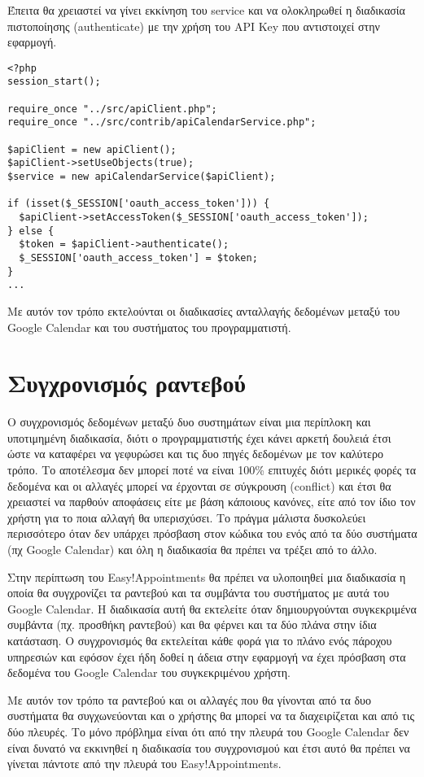 Έπειτα θα χρειαστεί να γίνει εκκίνηση του service και να ολοκληρωθεί η διαδικασία πιστοποίησης (authenticate) με την χρήση του API Key  που αντιστοιχεί στην εφαρμογή.

\begin{verbatim}
<?php
session_start();

require_once "../src/apiClient.php";
require_once "../src/contrib/apiCalendarService.php";

$apiClient = new apiClient();
$apiClient->setUseObjects(true);
$service = new apiCalendarService($apiClient);

if (isset($_SESSION['oauth_access_token'])) {
  $apiClient->setAccessToken($_SESSION['oauth_access_token']);
} else {
  $token = $apiClient->authenticate();
  $_SESSION['oauth_access_token'] = $token;
}
...
\end{verbatim}

Με αυτόν τον τρόπο εκτελούνται οι διαδικασίες ανταλλαγής δεδομένων μεταξύ του Google Calendar και του συστήματος του προγραμματιστή.

\section{Συγχρονισμός ραντεβού}
Ο συγχρονισμός δεδομένων μεταξύ δυο συστημάτων είναι μια περίπλοκη και υποτιμημένη διαδικασία, διότι ο προγραμματιστής έχει κάνει αρκετή δουλειά έτσι ώστε να καταφέρει να γεφυρώσει και τις δυο πηγές δεδομένων με τον καλύτερο τρόπο. Το αποτέλεσμα δεν μπορεί ποτέ να είναι 100\% επιτυχές διότι μερικές φορές τα δεδομένα και οι αλλαγές μπορεί να έρχονται σε σύγκρουση (conflict) και έτσι θα χρειαστεί να παρθούν αποφάσεις είτε με βάση κάποιους κανόνες, είτε από τον ίδιο τον χρήστη για το ποια αλλαγή θα υπερισχύσει. Το πράγμα μάλιστα δυσκολεύει περισσότερο όταν δεν υπάρχει πρόσβαση στον κώδικα του ενός από τα δύο συστήματα (πχ Google Calendar) και όλη η διαδικασία θα πρέπει να τρέξει από το άλλο. 

Στην περίπτωση του Easy!Appointments θα πρέπει να υλοποιηθεί μια διαδικασία η οποία θα συγχρονίζει τα ραντεβού και τα συμβάντα του συστήματος με αυτά του Google Calendar. Η διαδικασία αυτή θα εκτελείτε όταν δημιουργούνται συγκεκριμένα συμβάντα (πχ. προσθήκη ραντεβού) και θα φέρνει και τα δύο πλάνα στην ίδια κατάσταση. Ο συγχρονισμός θα εκτελείται κάθε φορά για το πλάνο ενός πάροχου υπηρεσιών και εφόσον έχει ήδη δοθεί η άδεια στην εφαρμογή να έχει πρόσβαση στα δεδομένα του Google Calendar του συγκεκριμένου χρήστη.

Με αυτόν τον τρόπο τα ραντεβού και οι αλλαγές που θα γίνονται από τα δυο συστήματα θα συγχωνεύονται και ο χρήστης θα μπορεί να τα διαχειρίζεται και από τις δύο πλευρές. Το μόνο πρόβλημα είναι ότι από την πλευρά του Google Calendar δεν είναι δυνατό να εκκινηθεί η διαδικασία του συγχρονισμού και έτσι αυτό θα πρέπει να γίνεται πάντοτε από την πλευρά του Easy!Appointments. 

